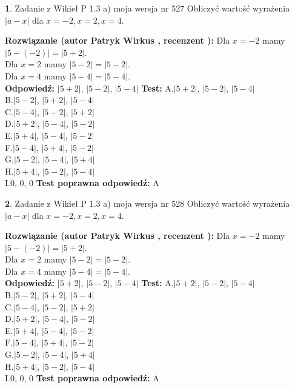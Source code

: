 \documentclass[12pt, a4paper]{article}
\theoremstyle{definition} %
\newtheorem{zad}{}
\newcommand{\zadStart}[1]{\begin{zad}#1\newline}
\newcommand{\zadStop}{\end{zad}}
\newcommand{\rozwStart}[2]{\noindent \textbf{Rozwiązanie (autor #1 , recenzent #2): }\newline}
\newcommand{\rozwStop}{\newline}
\newcommand{\odpStart}{\noindent \textbf{Odpowiedź:}\newline}
\newcommand{\odpStop}{\newline}
\newcommand{\testStart}{\noindent \textbf{Test:}\newline}
\newcommand{\testStop}{\newline}
\newcommand{\kluczStart}{\noindent \textbf{Test poprawna odpowiedź:}\newline}
\newcommand{\kluczStop}{\newline}
\begin{document}
\zadStart{Zadanie z Wikieł P 1.3 a) moja wersja nr 527}
Obliczyć wartość wyrażenia $|a - x|$ dla $x=-2,x=2,x=4$.
\zadStop
\rozwStart{Patryk Wirkus}{}
Dla $x = -2$ mamy $|5 - (-2)| = |5 + 2|$.\\
Dla $x = 2$ mamy $|5 - 2| = |5 - 2|$.\\
Dla $x = 4$ mamy $|5 - 4| = |5 - 4|$.\\
\rozwStop
\odpStart
$|5 + 2|$, $|5 - 2|$, $|5 - 4|$
\odpStop
\testStart
A.$|5 + 2|$, $|5 - 2|$, $|5 - 4|$\\
B.$|5 - 2|$, $|5 + 2|$, $|5 - 4|$\\
C.$|5 - 4|$, $|5 - 2|$, $|5 + 2|$\\
D.$|5 + 2|$, $|5 - 4|$, $|5 - 2|$\\
E.$|5 + 4|$, $|5 - 4|$, $|5 - 2|$\\
F.$|5 - 4|$, $|5 + 4|$, $|5 - 2|$\\
G.$|5 - 2|$, $|5 - 4|$, $|5 + 4|$\\
H.$|5 + 4|$, $|5 - 2|$, $|5 - 4|$\\
I.$0$, $0$, $0$
\testStop
\kluczStart
A
\kluczStop



\zadStart{Zadanie z Wikieł P 1.3 a) moja wersja nr 528}
Obliczyć wartość wyrażenia $|a - x|$ dla $x=-2,x=2,x=4$.
\zadStop
\rozwStart{Patryk Wirkus}{}
Dla $x = -2$ mamy $|5 - (-2)| = |5 + 2|$.\\
Dla $x = 2$ mamy $|5 - 2| = |5 - 2|$.\\
Dla $x = 4$ mamy $|5 - 4| = |5 - 4|$.\\
\rozwStop
\odpStart
$|5 + 2|$, $|5 - 2|$, $|5 - 4|$
\odpStop
\testStart
A.$|5 + 2|$, $|5 - 2|$, $|5 - 4|$\\
B.$|5 - 2|$, $|5 + 2|$, $|5 - 4|$\\
C.$|5 - 4|$, $|5 - 2|$, $|5 + 2|$\\
D.$|5 + 2|$, $|5 - 4|$, $|5 - 2|$\\
E.$|5 + 4|$, $|5 - 4|$, $|5 - 2|$\\
F.$|5 - 4|$, $|5 + 4|$, $|5 - 2|$\\
G.$|5 - 2|$, $|5 - 4|$, $|5 + 4|$\\
H.$|5 + 4|$, $|5 - 2|$, $|5 - 4|$\\
I.$0$, $0$, $0$
\testStop
\kluczStart
A
\kluczStop
\end{document}
